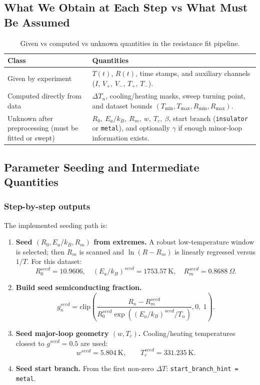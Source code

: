 \documentclass[11pt]{article}
\begin{document}
\subsection{What We Obtain at Each Step vs What Must Be Assumed}
\begin{table}[htbp]
\centering
\small
\caption{Given vs computed vs unknown quantities in the resistance fit pipeline.}
\label{tab:fit_known_unknown}
\begin{tabular}{p{}p{}}
\toprule
Class & Quantities \\
\midrule
Given by experiment &
\(T(t)\), \(R(t)\), time stamps, and auxiliary channels (\(I\), \(V_+\), \(V_-\), \(T_+\), \(T_-\)). \\
Computed directly from data &
\(\Delta T_n\), cooling/heating masks, sweep turning point, and dataset bounds \((T_{\min},T_{\max},R_{\min},R_{\max})\). \\
Unknown after preprocessing (must be fitted or swept) &
\(R_0,\ E_a/k_B,\ R_m,\ w,\ T_c,\ \beta\), start branch (\texttt{insulator} or \texttt{metal}), and optionally \(\gamma\) if enough minor-loop information exists. \\
\bottomrule
\end{tabular}
\end{table}

\subsection{Parameter Seeding and Intermediate Quantities}
\subsubsection*{Step-by-step outputs}
The implemented seeding path is:
\begin{enumerate}
    \item \textbf{Seed \((R_0,E_a/k_B,R_m)\) from extremes.}
    A robust low-temperature window is selected; then \(R_m\) is scanned and
    \(\ln(R-R_m)\) is linearly regressed versus \(1/T\).
    For this dataset:
    \[
    R_0^{seed}=10.9606,\quad
    (E_a/k_B)^{seed}=1753.57\ \mathrm{K},\quad
    R_m^{seed}=0.8688\ \Omega.
    \]
    \item \textbf{Build seed semiconducting fraction.}
    \begin{equation}
    g_n^{seed}
    =
    \mathrm{clip}\!\left(
    \frac{R_n-R_m^{seed}}
    {R_0^{seed}\exp\!\left((E_a/k_B)^{seed}/T_n\right)},
    0,\ 1
    \right).
    \label{eq:fit_g_seed}
    \end{equation}
    \item \textbf{Seed major-loop geometry \((w,T_c)\).}
    Cooling/heating temperatures closest to \(g^{seed}=0.5\) are used:
    \[
    w^{seed}=5.804\ \mathrm{K},\qquad
    T_c^{seed}=331.235\ \mathrm{K}.
    \]
    \item \textbf{Seed start branch.}
    From the first non-zero \(\Delta T\): \texttt{start\_branch\_hint = metal}.
\end{enumerate}
\end{document}
